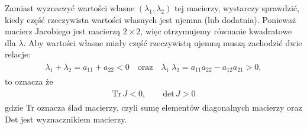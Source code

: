 \documentclass[a4paper,12pt,polish]{sphinxmanual}
\begin{document}
Zamiast wyznaczyć wartości własne $(\lambda_{1}, \lambda_{2})$ tej macierzy, wystarczy sprawdzić, kiedy część rzeczywista wartości własnych jest ujemna (lub dodatnia).  Ponieważ macierz Jacobiego jest macierzą $2 \times 2$, więc otrzymujemy równanie kwadratowe  dla $\lambda$. Aby wartości własne miały część rzeczywistą ujemną muszą zachodzić dwie relacje:
\label{ch1/chI023:equation-eqn46}\begin{gather}
\begin{split}\lambda_1 + \lambda_2  = a_{11}  + a_{22} <0  \quad \mbox{oraz} \quad \lambda_1 \; \lambda_2 = a_{11} a_{22}  -a_{12}a_{21} > 0,\end{split}\label{ch1/chI023-eqn46}
\end{gather}
to oznacza że
\label{ch1/chI023:equation-eqn46a}\begin{gather}
\begin{split}\mbox{Tr} \, J < 0, \quad \quad \mbox{det} \,J > 0\end{split}\label{ch1/chI023-eqn46a}
\end{gather}
gdzie Tr oznacza ślad macierzy, czyli sumę elementów diagonalnych macierzy oraz Det jest wyznacznikiem macierzy.
\end{document}
